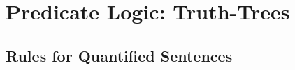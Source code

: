 \documentclass[../logic-text.tex]{subfiles}
\begin{document}
\chapter{Predicate Logic: Truth-Trees}
\label{cha:pred-logic:-trees}


\section{Rules for Quantified Sentences}
\label{sec:rules-quant-sent}
\end{document}
